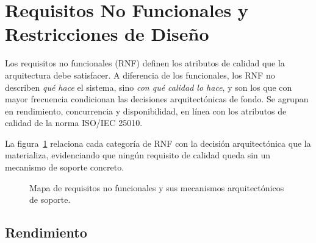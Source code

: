\section{Requisitos No Funcionales y Restricciones de Diseño}
\label{sec:rnf}

Los requisitos no funcionales (RNF) definen los atributos de calidad que la
arquitectura debe satisfacer. A diferencia de los funcionales, los RNF no describen
\textit{qué hace} el sistema, sino \textit{con qué calidad lo hace}, y son los que
con mayor frecuencia condicionan las decisiones arquitectónicas de fondo. Se agrupan en
rendimiento, concurrencia y disponibilidad, en línea con los atributos de calidad de la
norma ISO/IEC 25010.

La figura~\ref{fig:rnf-mapa} relaciona cada categoría de RNF con la decisión
arquitectónica que la materializa, evidenciando que ningún requisito de calidad queda
sin un mecanismo de soporte concreto.

\clearpage
\vspace{0.3cm}
\begin{figure}[h!]
\centering
{}
\caption{Mapa de requisitos no funcionales y sus mecanismos arquitectónicos de soporte.}
\label{fig:rnf-mapa}
\end{figure}

\subsection{Rendimiento}
\label{subsec:rnf_rendimiento}

